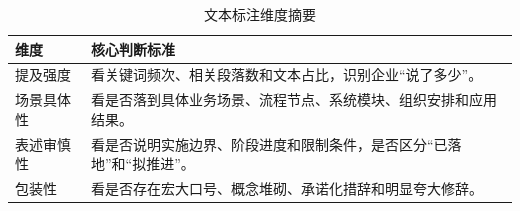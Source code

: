 \begin{table}[H]
    \centering
    \caption{文本标注维度摘要}
    \begin{tabular}{p{3cm}p{9.5cm}}
        \toprule
        维度    & 核心判断标准                               \\
        \midrule
        提及强度  & 看关键词频次、相关段落数和文本占比，识别企业“说了多少”。        \\
        场景具体性 & 看是否落到具体业务场景、流程节点、系统模块、组织安排和应用结果。     \\
        表述审慎性 & 看是否说明实施边界、阶段进度和限制条件，是否区分“已落地”和“拟推进”。 \\
        包装性   & 看是否存在宏大口号、概念堆砌、承诺化措辞和明显夸大修辞。         \\
        \bottomrule
    \end{tabular}
\end{table}
